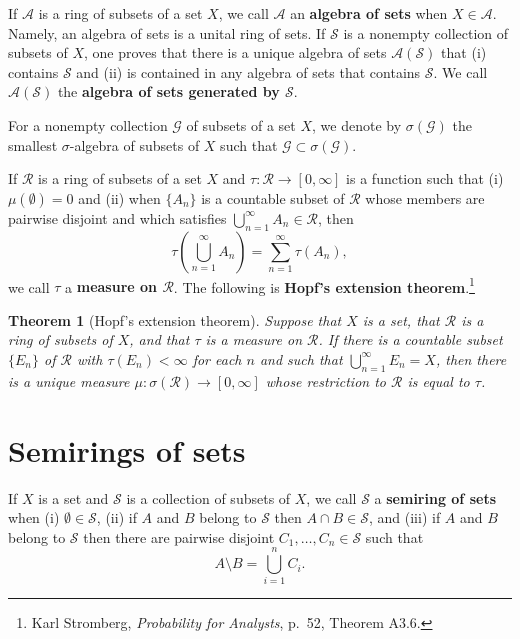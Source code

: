 \documentclass{article}
\newtheorem{theorem}{Theorem}
\theoremstyle{definition}
\begin{document}
If $\mathscr{A}$ is a ring of subsets of a set $X$, we call $\mathscr{A}$ an \textbf{algebra of sets} when $X \in \mathscr{A}$. Namely, an algebra of sets is a unital
ring of sets. If $\mathscr{S}$ is a nonempty collection of subsets of $X$, one proves that there is a unique algebra of sets
$\mathscr{A}(\mathscr{S})$ that (i) contains $\mathscr{S}$ and (ii) is contained in any algebra of sets that contains $\mathscr{S}$. We call
$\mathscr{A}(\mathscr{S})$ the \textbf{algebra of sets generated by $\mathscr{S}$}.

For a nonempty collection $\mathscr{G}$ of subsets of a set $X$, we denote by $\sigma(\mathscr{G})$ the smallest $\sigma$-algebra
of subsets of $X$ such that $\mathscr{G} \subset \sigma(\mathscr{G})$.

If $\mathscr{R}$ is a ring of subsets of a set $X$ and $\tau:\mathscr{R} \to [0,\infty]$ is a function such that
(i) $\mu(\emptyset)=0$ and (ii) when $\{A_n\}$ is a countable subset of $\mathscr{R}$ whose members are pairwise
disjoint and which satisfies $\bigcup_{n=1}^\infty A_n \in \mathscr{R}$, then
\[
\tau\left( \bigcup_{n=1}^\infty A_n \right) = \sum_{n=1}^\infty \tau(A_n),
\]
we call $\tau$ a \textbf{measure on $\mathscr{R}$}. The following is \textbf{Hopf's extension theorem}.\footnote{Karl Stromberg, {\em Probability for Analysts}, p.~52, Theorem A3.6.}


\begin{theorem}[Hopf's extension theorem]
Suppose that $X$ is a set, that $\mathscr{R}$ is a ring of subsets of $X$, and that $\tau$ is a measure
on $\mathscr{R}$. If there is a countable subset $\{E_n\}$ of $\mathscr{R}$ with $\tau(E_n)<\infty$ for each $n$ and such
that $\bigcup_{n=1}^\infty E_n = X$, then there is a unique measure $\mu:\sigma(\mathscr{R}) \to [0,\infty]$ whose
restriction to $\mathscr{R}$ is equal to $\tau$.
\end{theorem}



\section{Semirings of sets}
If $X$ is a set and $\mathscr{S}$ is a collection of subsets of $X$, we call $\mathscr{S}$ a \textbf{semiring of sets} when
(i) $\emptyset \in \mathscr{S}$, (ii) if $A$ and $B$ belong to $\mathscr{S}$ then $A \cap B \in \mathscr{S}$, and (iii)
if $A$ and $B$ belong to $\mathscr{S}$ then there are pairwise disjoint $C_1,\ldots,C_n \in \mathscr{S}$ such that
\[
A \setminus B = \bigcup_{i=1}^n C_i.
\]
\end{document}
